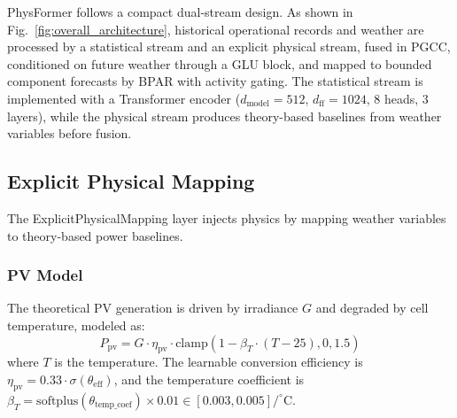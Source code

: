 PhysFormer follows a compact dual-stream design. As shown in Fig.~\ref{fig:overall_architecture}, historical operational records and weather are processed by a statistical stream and an explicit physical stream, fused in PGCC, conditioned on future weather through a GLU block, and mapped to bounded component forecasts by BPAR with activity gating. The statistical stream is implemented with a Transformer encoder ($d_{\text{model}}=512$, $d_{\text{ff}}=1024$, $8$ heads, $3$ layers), while the physical stream produces theory-based baselines from weather variables before fusion.

\subsection{Explicit Physical Mapping}
The ExplicitPhysicalMapping layer injects physics by mapping weather variables to theory-based power baselines.

\subsubsection{PV Model}
The theoretical PV generation is driven by irradiance $G$ and degraded by cell temperature, modeled as:
\begin{equation}
    P_{\text{pv}} = G \cdot \eta_{\text{pv}} \cdot \text{clamp}(1 - \beta_T \cdot (T - 25), 0, 1.5)
\label{eq:pv_model}
\end{equation}
where $T$ is the temperature. The learnable conversion efficiency is $\eta_{\text{pv}} = 0.33 \cdot \sigma(\theta_{\text{eff}})$, and the temperature coefficient is $\beta_T = \text{softplus}(\theta_{\text{temp\_coef}}) \times 0.01 \in [0.003, 0.005]/^\circ\text{C}$.

